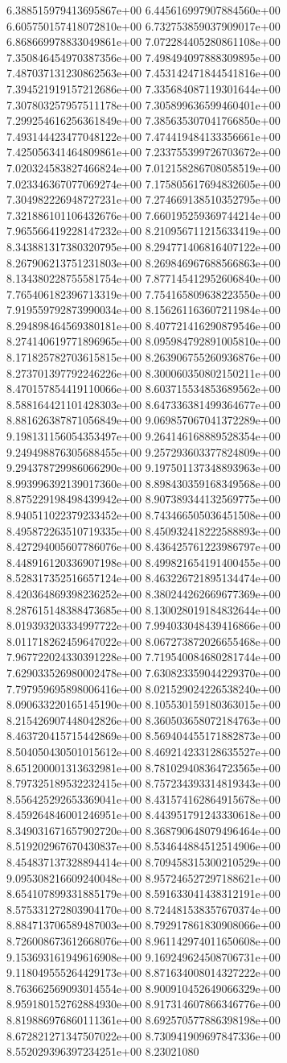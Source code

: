 	6.388515979413695867e+00	6.445616997907884560e+00	6.605750157418072810e+00	6.732753859037909017e+00	6.868669978833049861e+00	7.072284405280861108e+00	7.350846454970387356e+00	7.498494097888309895e+00	7.487037131230862563e+00	7.453142471844541816e+00	7.394521919157212686e+00	7.335684087119301644e+00	7.307803257957511178e+00	7.305899636599460401e+00	7.299254616256361849e+00	7.385635307041766850e+00	7.493144423477048122e+00	7.474419484133356661e+00	7.425056341464809861e+00	7.233755399726703672e+00	7.020324583827466824e+00	7.012158286708058519e+00	7.023346367077069274e+00	7.175805617694832605e+00	7.304982226948727231e+00	7.274669138510352795e+00	7.321886101106432676e+00	7.660195259369744214e+00	7.965566419228147232e+00	8.210956711215633419e+00	8.343881317380320795e+00	8.294771406816407122e+00	8.267906213751231803e+00	8.269846967688566863e+00	8.134380228755581754e+00	7.877145412952606840e+00	7.765406182396713319e+00	7.754165809638223550e+00	7.919559792873990034e+00	8.156261163607211984e+00	8.294898464569380181e+00	8.407721416290879546e+00	8.274140619771896965e+00	8.095984792891005810e+00	8.171825782703615815e+00	8.263906755260936876e+00	8.273701397792246226e+00	8.300060350802150211e+00	8.470157854419110066e+00	8.603715534853689562e+00	8.588164421101428303e+00	8.647336381499364677e+00	8.881626387871056849e+00	9.069857067041372289e+00	9.198131156054353497e+00	9.264146168889528354e+00	9.249498876305688455e+00	9.257293603377824809e+00	9.294378729986066290e+00	9.197501137348893963e+00	8.993996392139017360e+00	8.898430359168349568e+00	8.875229198498439942e+00	8.907389344132569775e+00	8.940511022379233452e+00	8.743466505036451508e+00	8.495872263510719335e+00	8.450932418222588893e+00	8.427294005607786076e+00	8.436425761223986797e+00	8.448916120336907198e+00	8.499821654191400455e+00	8.528317352516657124e+00	8.463226721895134474e+00	8.420364869398236252e+00	8.380244262669677369e+00	8.287615148388473685e+00	8.130028019184832644e+00	8.019393203334997722e+00	7.994033048439416866e+00	8.011718262459647022e+00	8.067273872026655468e+00	7.967722024330391228e+00	7.719540084680281744e+00	7.629033526980002478e+00	7.630823359044229370e+00	7.797959695898006416e+00	8.021529024226538240e+00	8.090633220165145190e+00	8.105530159180363015e+00	8.215426907448042826e+00	8.360503658072184763e+00	8.463720415715442869e+00	8.569404455171882873e+00	8.504050430501015612e+00	8.469214233128635527e+00	8.651200001313632981e+00	8.781029408364723565e+00	8.797325189532232415e+00	8.757234393314819343e+00	8.556425292653369041e+00	8.431574162864915678e+00	8.459264846001246951e+00	8.443951791243330618e+00	8.349031671657902720e+00	8.368790648079496464e+00	8.519202967670430837e+00	8.534644884512514906e+00	8.454837137328894414e+00	8.709458315300210529e+00	9.095308216609240048e+00	8.957246527297188621e+00	8.654107899331885179e+00	8.591633041438312191e+00	8.575331272803904170e+00	8.724481538357670374e+00	8.884713706589487003e+00	8.792917861830908066e+00	8.726008673612668076e+00	8.961142974011650608e+00	9.153693161949616908e+00	9.169249624508706731e+00	9.118049555264429173e+00	8.871634008014327222e+00	8.763662569093014554e+00	8.900910452649066329e+00	8.959180152762884930e+00	8.917314607866346776e+00	8.819886976860111361e+00	8.692570577886398198e+00	8.672821271347507022e+00	8.730941909697847336e+00	8.552029396397234251e+00	8.23021080